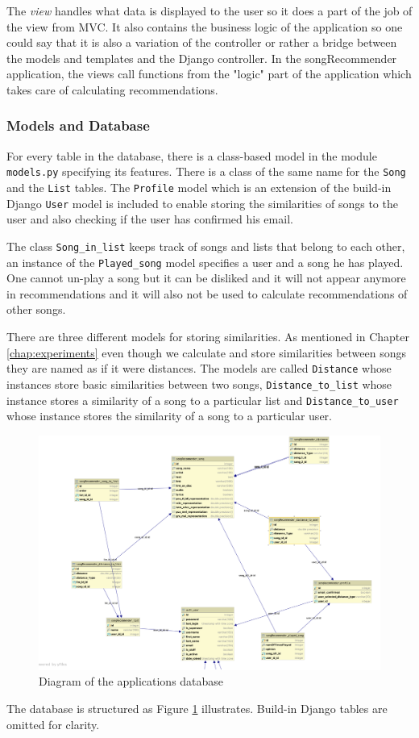 The \textit{view} handles what data is displayed to the user so it does a part of the job of the view from MVC. It also contains the business logic of the application so one could say that it is also a variation of the controller or rather a bridge between the models and templates and the Django controller. In the songRecommender application, the views call functions from the "logic" part of the application which takes care of calculating recommendations.


\subsubsection{Models and Database}
For every table in the database, there is a class-based model in the module \texttt{models.py} specifying its features. There is a class of the same name for the \texttt{Song} and the \texttt{List} tables. The \texttt{Profile} model which is an extension of the build-in Django \texttt{User} model is included to enable storing the similarities of songs to the user and also checking if the user has confirmed his email.
 
The class \texttt{Song\_in\_list} keeps track of songs and lists that belong to each other, an instance of the \texttt{Played\_song} model specifies a user and a song he has played. One cannot un-play a song but it can be disliked and it will not appear anymore in recommendations and it will also not be used to calculate recommendations of other songs. 

There are three different models for storing similarities. As mentioned in Chapter \ref{chap:experiments} even though we calculate and store similarities between songs they are named as if it were distances. The models are called \texttt{Distance} whose instances store basic similarities between two songs, \texttt{Distance\_to\_list} whose instance stores a similarity of a song to a particular list and \texttt{Distance\_to\_user} whose instance stores the similarity of a song to a particular user. 
\begin{figure}[ht]
    \centering
	\includegraphics[width=120mm]{./img/postgres_databaze.png}
	\caption{Diagram of the applications database}
	\label{fig:diagram}
\end{figure}
The database is structured as Figure \ref{fig:diagram} illustrates. Build-in Django tables are omitted for clarity.


